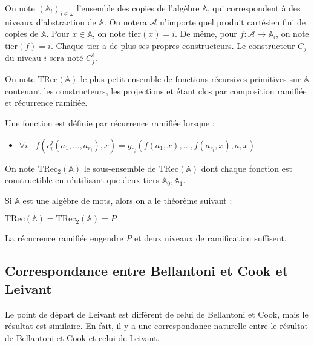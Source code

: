 \documentclass{report}
\newcommand{\bbA}{\mathbb{A}}
\newcommand{\TRec}[1]{\text{TRec}\left(\mathbb{#1}\right)}
\newcommand{\TRecd}[1]{\text{TRec}_{2}\left(\mathbb{#1}\right)}
\begin{document}
		\cite{Leivant1995}
		
		On note $(\bbA_i)_{i\in \omega}$ l'ensemble des copies de l'algèbre $\bbA$, qui correspondent à des niveaux d'abstraction de $\bbA$. On notera $\mathcal{A}$ n'importe quel produit cartésien fini de copies de $\bbA$. Pour $x\in \bbA$, on note $\text{tier}(x) = i$. De même, pour $f : \mathcal{A} \to \bbA_i$, on note $\text{tier}(f) = i$. Chaque tier a de plus ses propres constructeurs. Le constructeur $C_j$ du niveau $i$ sera noté $C_j^i$. 
		
		\begin{definition} 
			\label{def:TRecA}
			On note $\TRec{A}$ le plus petit ensemble de fonctions récursives primitives sur $\bbA$ contenant les constructeurs, les projections et étant clos par composition ramifiée et récurrence ramifiée.
			
			
			Une fonction est définie par récurrence ramifiée lorsque :
			
			\begin{itemize}
				\item 	$\forall i \:\:\:\:
				f(c_i^j(a_1, \dots, a_{r_i}), \bar{x}) 
				= g_{c_i}\left( f(a_1, \bar{x}), \dots, f(a_{r_i}, \bar{x}), \bar{a}, \bar{x} \right)
				$
			\end{itemize}
			
			
			On note $\TRecd{A}$ le sous-ensemble de $\TRec{A}$ dont chaque fonction est constructible en n'utilisant que deux tiers $\bbA_0, \bbA_1$.
		\end{definition}
		
		Si $\bbA$ est une algèbre de mots, alors on a le théorème suivant :
		
		\begin{theorem}
			\label{thm:TRecA_equals_P}
			$\TRec{A} = \TRecd{A} = P$
		\end{theorem}
		
		La récurrence ramifiée engendre $P$ et deux niveaux de ramification suffisent.
	
	
		\subsection{Correspondance entre Bellantoni et Cook et Leivant}
		\label{subsec:corres_BC_Leivant}
	
		Le point de départ de Leivant est différent de celui de Bellantoni et Cook, mais le résultat est similaire. En fait, il y a une correspondance naturelle entre le résultat de Bellantoni et Cook et celui de Leivant.
		
\end{document}

